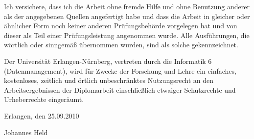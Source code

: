\thispagestyle{empty}
Ich versichere, dass ich die Arbeit ohne fremde Hilfe und ohne Benutzung anderer als der angegebenen Quellen angefertigt habe und dass die Arbeit in gleicher oder ähnlicher Form noch keiner anderen Prüfungsbehörde vorgelegen hat und von dieser als Teil einer Prüfungsleistung angenommen wurde. Alle Ausführungen, die wörtlich oder sinngemäß übernommen wurden, sind als solche gekennzeichnet.
\vspace{2cm}

Der Universität Erlangen-Nürnberg, vertreten durch die Informatik 6 (Datenmanagement), wird für Zwecke der Forschung und Lehre ein einfaches, kostenloses, zeitlich und örtlich unbeschränktes Nutzungsrecht an den Arbeitsergebnissen der Diplomarbeit einschließlich etwaiger Schutzrechte und Urheberrechte eingeräumt.

\vspace{2cm}
Erlangen, den 25.09.2010

\vspace{2cm}
Johannes Held \hfill \ 

\vspace{0,5cm}

\clearpage{\pagestyle{empty}\cleardoublepage}
